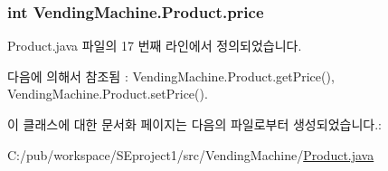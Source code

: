 \subsubsection[{\texorpdfstring{price}{price}}]{\setlength{\rightskip}{0pt plus 5cm}int Vending\+Machine.\+Product.\+price\hspace{0.3cm}{\ttfamily [private]}}\hypertarget{class_vending_machine_1_1_product_a5f80a5a57248015f48edb6354b6d23ed}{}\label{class_vending_machine_1_1_product_a5f80a5a57248015f48edb6354b6d23ed}


Product.\+java 파일의 17 번째 라인에서 정의되었습니다.



다음에 의해서 참조됨 \+:  Vending\+Machine.\+Product.\+get\+Price(), Vending\+Machine.\+Product.\+set\+Price().



이 클래스에 대한 문서화 페이지는 다음의 파일로부터 생성되었습니다.\+:\begin{DoxyCompactItemize}
\item 
C\+:/pub/workspace/\+S\+Eproject1/src/\+Vending\+Machine/\hyperlink{_product_8java}{Product.\+java}\end{DoxyCompactItemize}
